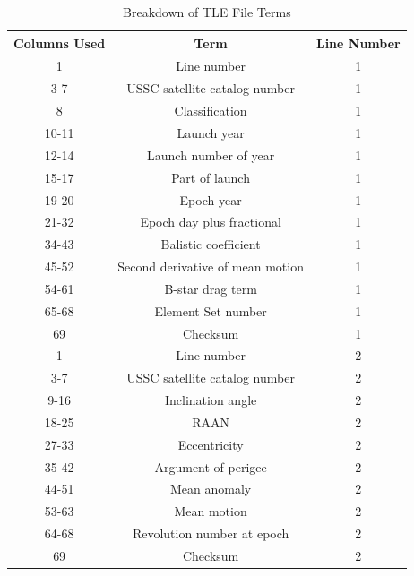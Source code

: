 \documentclass[12pt]{report}
\begin{document}
\begin{table}
\begin{center}
    \begin{tabular}{|c|c|c|}
        \hline
        Columns Used & Term & Line Number \\
        \hline
        1 & Line number & 1 \\
        \hline
        3-7 & USSC satellite catalog number & 1 \\
        \hline
        8 & Classification & 1 \\
        \hline
        10-11 & Launch year & 1\\
        \hline
        12-14 & Launch number of year & 1 \\
        \hline
        15-17 & Part of launch & 1 \\
        \hline 
        19-20 & Epoch year & 1 \\
        \hline
        21-32 & Epoch day plus fractional & 1 \\
        \hline
        34-43 & Balistic coefficient & 1 \\
        \hline
        45-52 & Second derivative of mean motion & 1 \\
        \hline
        54-61 & B-star drag term & 1 \\
        \hline
        65-68 & Element Set number & 1 \\
        \hline
        69 & Checksum & 1 \\
        \hline\hline
        1 & Line number & 2 \\
        \hline
        3-7 & USSC satellite catalog number & 2 \\
        \hline
        9-16 & Inclination angle & 2 \\
        \hline
        18-25 & RAAN & 2 \\
        \hline
        27-33 & Eccentricity & 2 \\
        \hline
        35-42 & Argument of perigee & 2 \\
        \hline
        44-51 & Mean anomaly & 2 \\
        \hline
        53-63 & Mean motion & 2 \\
        \hline
        64-68 & Revolution number at epoch & 2 \\
        \hline
        69 & Checksum & 2 \\
        \hline\hline
    \end{tabular}
    \caption{Breakdown of TLE File Terms}
    \label{table:breakdowntle}
\end{center}
\end{table}
\end{document}

